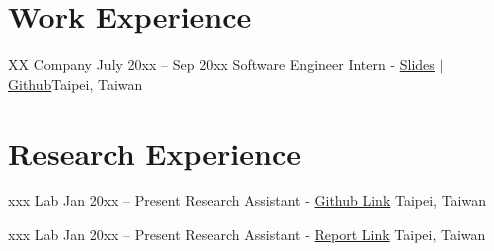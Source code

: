 \section{Work Experience}
\resumeSubHeadingListStart
    
    \resumeSubheading
    {XX Company}{ July 20xx -- Sep 20xx}
    {Software Engineer Intern - \textcolor{MidnightBlue} {\href{https://xxx.com}{Slides}} $|$ 
    \textcolor{MidnightBlue} 
    {\href{https://xxx.com}{Github}}}{Taipei, Taiwan}
    \resumeItemListStart
    \resumeItemListEnd

\resumeSubHeadingListEnd


\section{Research Experience}
\resumeSubHeadingListStart
    \resumeSubheading
    {xxx Lab}{ Jan 20xx -- Present}
    {Research Assistant 
    - \textcolor{MidnightBlue} {\href{https://xxx.com}{Github Link}}
    }{Taipei, Taiwan} 
    \resumeItemListStart
    \resumeItemListEnd
    
    \resumeSubheading
    {xxx Lab}{ Jan 20xx -- Present}
    {Research Assistant 
    - \textcolor{MidnightBlue} {\href{https://xxx.com}{Report Link}}
    }{Taipei, Taiwan} 
    \resumeItemListStart
    \resumeItemListEnd
\resumeSubHeadingListEnd
